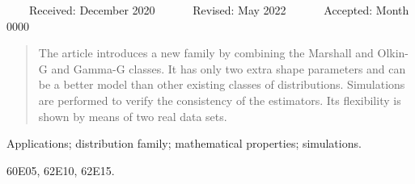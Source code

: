 \documentclass[twoside,leqno,11pt]{article}
\begin{document}

\maketitle
\setpagewiselinenumbers
\modulolinenumbers[1]
\linenumbers
\noindent
~~~~{\small{\sffamily Received:} December 2020 ~~~~~~{\sffamily Revised:} May 2022 ~~~~~~{\sffamily Accepted:} Month 0000}

\begin{abstract}
The article introduces a new family by combining the Marshall and Olkin-G and Gamma-G classes. It has only two
extra shape parameters and can be a better model than other existing classes of distributions. Simulations are performed to verify the consistency of the estimators. Its flexibility is shown by means of two real data sets.
\end{abstract}

\begin{keywords}
Applications; distribution family; mathematical properties; simulations. 
\end{keywords}

\begin{ams}
60E05, 62E10, 62E15.
\end{ams}
\end{document}
